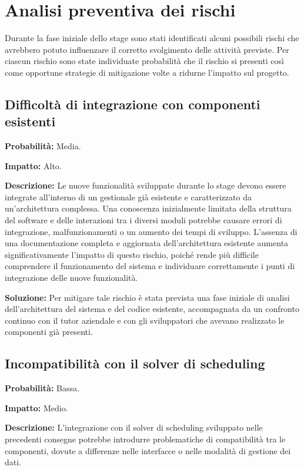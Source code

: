 \section{Analisi preventiva dei rischi}

Durante la fase iniziale dello stage sono stati identificati alcuni possibili rischi che avrebbero potuto influenzare il corretto svolgimento delle attività previste. 
Per ciascun rischio sono state individuate probabilità che il rischio si presenti così come opportune strategie di mitigazione volte a ridurne l'impatto sul progetto.

\subsection{Difficoltà di integrazione con componenti esistenti}

\textbf{Probabilità:} Media.

\textbf{Impatto:} Alto.

\textbf{Descrizione:}
Le nuove funzionalità sviluppate durante lo stage devono essere integrate all'interno di un gestionale già esistente e caratterizzato da un'architettura complessa. Una 
conoscenza inizialmente limitata della struttura del software e delle interazioni tra i diversi moduli potrebbe causare errori di integrazione, malfunzionamenti o un aumento 
dei tempi di sviluppo. L'assenza di una documentazione completa e aggiornata dell'architettura esistente aumenta significativamente l'impatto di questo rischio, poiché rende 
più difficile comprendere il funzionamento del sistema e individuare correttamente i punti di integrazione delle nuove funzionalità.

\textbf{Soluzione:}
Per mitigare tale rischio è stata prevista una fase iniziale di analisi dell'architettura del sistema e del codice esistente, accompagnata da un confronto continuo con il tutor 
aziendale e con gli sviluppatori che avevano realizzato le componenti già presenti.


\subsection{Incompatibilità con il solver di scheduling}

\textbf{Probabilità:} Bassa.

\textbf{Impatto:} Medio.

\textbf{Descrizione:}
L'integrazione con il solver di scheduling sviluppato nelle precedenti consegne potrebbe introdurre problematiche di compatibilità tra le componenti, dovute a differenze 
nelle interfacce o nelle modalità di gestione dei dati.

